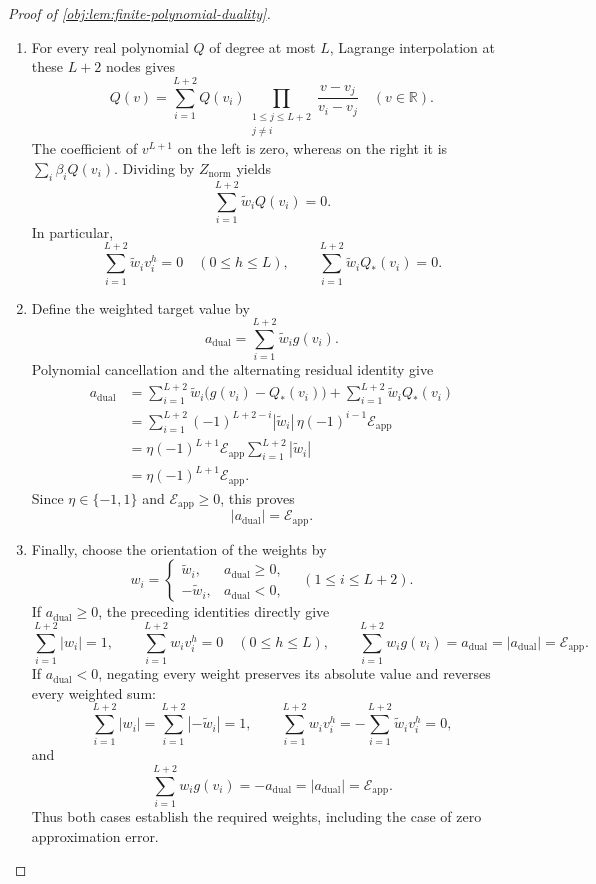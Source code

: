 \begin{proof}[Proof of \cref{obj:lem:finite-polynomial-duality}]
\begin{enumerate}
\item For every real polynomial \(Q\) of degree at most \(L\), Lagrange interpolation at these \(L+2\) nodes gives
\[
Q(v)
=
\sum_{i=1}^{L+2}
Q(v_i)
\prod_{\substack{1\le j\le L+2\\j\ne i}}
\frac{v-v_j}{v_i-v_j}
\quad(v\in\mathbb R).
\]
The coefficient of \(v^{L+1}\) on the left is zero, whereas on the right it is \(\sum_i\beta_iQ(v_i)\). Dividing by \(Z_{\mathrm{norm}}\) yields
\[
\sum_{i=1}^{L+2}\widetilde w_iQ(v_i)=0.
\]
In particular,
\[
\sum_{i=1}^{L+2}\widetilde w_i v_i^h=0
\quad(0\le h\le L),
\qquad
\sum_{i=1}^{L+2}\widetilde w_iQ_*(v_i)=0.
\]

\item Define the weighted target value by
\[
a_{\mathrm{dual}}
=
\sum_{i=1}^{L+2}\widetilde w_i g(v_i).
\]
Polynomial cancellation and the alternating residual identity give
\[
\begin{aligned}
a_{\mathrm{dual}}
&=
\sum_{i=1}^{L+2}\widetilde w_i\bigl(g(v_i)-Q_*(v_i)\bigr)
+\sum_{i=1}^{L+2}\widetilde w_iQ_*(v_i)\\
&=
\sum_{i=1}^{L+2}
(-1)^{L+2-i}|\widetilde w_i|\,
\eta(-1)^{i-1}\mathcal E_{\mathrm{app}}\\
&=
\eta(-1)^{L+1}\mathcal E_{\mathrm{app}}
\sum_{i=1}^{L+2}|\widetilde w_i|\\
&=\eta(-1)^{L+1}\mathcal E_{\mathrm{app}}.
\end{aligned}
\]
Since \(\eta\in\{-1,1\}\) and \(\mathcal E_{\mathrm{app}}\ge0\), this proves
\[
|a_{\mathrm{dual}}|=\mathcal E_{\mathrm{app}}.
\]

\item Finally, choose the orientation of the weights by
\[
w_i=
\begin{cases}
\widetilde w_i,&a_{\mathrm{dual}}\ge0,\\
-\widetilde w_i,&a_{\mathrm{dual}}<0,
\end{cases}
\quad(1\le i\le L+2).
\]
If \(a_{\mathrm{dual}}\ge0\), the preceding identities directly give
\[
\sum_{i=1}^{L+2}|w_i|=1,
\qquad
\sum_{i=1}^{L+2}w_iv_i^h=0
\quad(0\le h\le L),
\qquad
\sum_{i=1}^{L+2}w_ig(v_i)
=a_{\mathrm{dual}}
=|a_{\mathrm{dual}}|
=\mathcal E_{\mathrm{app}}.
\]
If \(a_{\mathrm{dual}}<0\), negating every weight preserves its absolute value and reverses every weighted sum:
\[
\sum_{i=1}^{L+2}|w_i|
=\sum_{i=1}^{L+2}|-\widetilde w_i|=1,
\qquad
\sum_{i=1}^{L+2}w_iv_i^h
=-\sum_{i=1}^{L+2}\widetilde w_iv_i^h=0,
\]
and
\[
\sum_{i=1}^{L+2}w_ig(v_i)
=-a_{\mathrm{dual}}
=|a_{\mathrm{dual}}|
=\mathcal E_{\mathrm{app}}.
\]
Thus both cases establish the required weights, including the case of zero approximation error.


\end{enumerate}
\end{proof}
